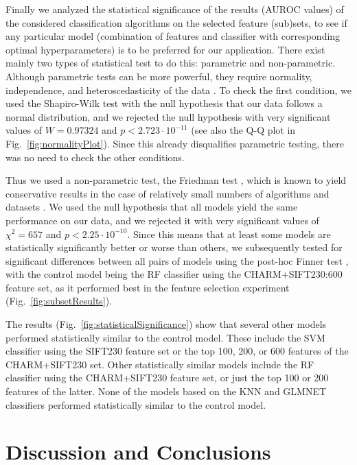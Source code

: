 Finally we analyzed the statistical significance of the results (AUROC values) of the considered classification algorithms on the selected feature (sub)sets, to see if any particular model (combination of features and classifier with corresponding optimal hyperparameters) is to be preferred for our application. There exist mainly two types of statistical test to do this: parametric and non-parametric. Although parametric tests can be more powerful, they require normality, independence, and heteroscedasticity of the data \cite{10.7717/peerj.2721}. To check the first condition, we used the Shapiro-Wilk test \cite{Shapiro-Wilk-1965} with the null hypothesis that our data follows a normal distribution, and we rejected the null hypothesis with very significant values of {\color{red}$W = 0.97324$ and $p < 2.723 \cdot 10^{-11}$} (see also the Q-Q plot in Fig.~\ref{fig:normalityPlot}). Since this already disqualifies parametric testing, there was no need to check the other conditions.

Thus we used a non-parametric test, the Friedman test \cite{Friedman-1940}, which is known to yield conservative results in the case of relatively small numbers of algorithms and datasets \cite{Garcia-2010}. We used the null hypothesis that all models yield the same performance on our data, and we rejected it with very significant values of {\color{red}$\chi^2 = 657$ and $p < 2.25 \cdot 10^{-10}$}. Since this means that at least some models are statistically significantly better or worse than others, we subsequently tested for significant differences between all pairs of models using the post-hoc {\color{red}Finner test \cite{Finner1993}, with the control model being the RF classifier using the CHARM+SIFT230:600 feature set, as it performed best in the feature selection experiment (Fig.~\ref{fig:subsetResults})}.

The results (Fig.~\ref{fig:statisticalSignificance}) show that several other models performed statistically similar to the control model. {\color{red}These include the SVM classifier using the SIFT230 feature set or the top 100, 200, or 600 features of the CHARM+SIFT230 set. Other statistically similar models include the RF classifier using the CHARM+SIFT230 feature set, or just the top 100 or 200 features of the latter. None of the models based on the KNN and GLMNET classifiers performed statistically similar to the control model.}

\section{Discussion and Conclusions}
\label{sec:discussion}

